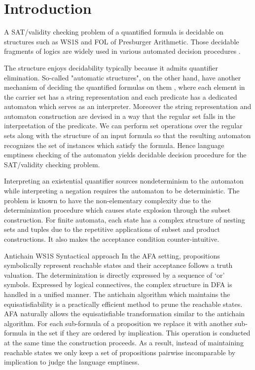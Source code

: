 \section{Introduction}

A SAT/validity checking problem of a quantified formula is decidable on
structures such as WS1S and FOL of Presburger Arithmetic. Those decidable
fragments of logics are widely used in various automated decision
procedures \cite{KlaEtAl:Mona}.

The structure enjoys decidability typically because it admits quantifier
elimination. So-called "automatic structures", on the other hand, have another
mechanism of deciding the quantified formulas on them \cite{}, where each element
in the carrier set has a string representation and each predicate has a
dedicated automaton which serves as an interpreter. Moreover the string
representation and automaton construction are devised in a way that the regular
set falls in the interpretation of the predicate.  We can perform set
operations over the regular sets along with the structure of an input formula so
that the resulting automaton recognizes the set of instances which satisfy the
formula. Hence language emptiness checking of the automaton yields decidable
decision procedure for the SAT/validity checking problem.

 Interpreting an existential quantifier sources nondeterminism to
the automaton while interpreting a negation requires the automaton to be
deterministic. The problem is known to have the non-elementary complexity due to
the determinization procedure which causes state explosion through the subset
construction. For finite automata, each state has a complex structure of nesting
sets and tuples due to the repetitive applications of subset and product
constructions. It also makes the acceptance condition counter-intuitive.

 Antichain WS1S \cite{Fiedor2015,Fiedor2017}
 Syntactical approach \cite{Traytel15,TraytelN15}
In the AFA setting, propositions symbolically represent reachable states and
their acceptance follows a truth valuation. The determinization is directly
expressed by a sequence of `or' symbols. Expressed by logical connectives, the
complex structure in DFA is handled in a unified manner. The antichain algorithm
which maintains the equisatisfiability is a practically efficient method to
prune the reachable states. AFA naturally allows the equisatisfiable
transformation similar to the antichain algorithm. For each sub-formula of a
proposition we replace it with another sub-formula in the set if they are ordered
by implication. This operation is conducted at the same time the construction
proceeds. As a result, instead of maintaining reachable states we only keep a
set of propositions pairwise incomparable by implication to judge the language
emptiness.

